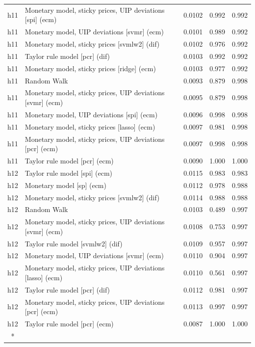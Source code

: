 \begin{ThreePartTable}
\begin{longtable}[t]{cp{5.5cm}ccc}
\addlinespace
h11 & \raggedright Monetary model, sticky prices, UIP deviations [spi] (ecm) & 0.0102 & 0.992 & 0.992\\
h11 & \raggedright Monetary model, UIP deviations [svmr] (ecm) & 0.0101 & 0.989 & 0.992\\
h11 & \raggedright Monetary model, sticky prices [svmlw2] (dif) & 0.0102 & 0.976 & 0.992\\
h11 & \raggedright Taylor rule model [pcr] (dif) & 0.0103 & 0.992 & 0.992\\
h11 & \raggedright Monetary model, sticky prices [ridge] (ecm) & 0.0103 & 0.977 & 0.992\\
h11 & \raggedright Random Walk & 0.0093 & 0.879 & 0.998\\
h11 & \raggedright Monetary model, sticky prices, UIP deviations [svmr] (ecm) & 0.0095 & 0.879 & 0.998\\
h11 & \raggedright Monetary model, UIP deviations [spi] (ecm) & 0.0096 & 0.998 & 0.998\\
h11 & \raggedright Monetary model, sticky prices [lasso] (ecm) & 0.0097 & 0.981 & 0.998\\
h11 & \raggedright Monetary model, sticky prices, UIP deviations [pcr] (ecm) & 0.0097 & 0.998 & 0.998\\
h11 & \raggedright Taylor rule model [pcr] (ecm) & 0.0090 & 1.000 & 1.000\\
\addlinespace
h12 & \raggedright Taylor rule model [spi] (ecm) & 0.0115 & 0.983 & 0.983\\
h12 & \raggedright Monetary model [sp] (ecm) & 0.0112 & 0.978 & 0.988\\
h12 & \raggedright Monetary model, sticky prices [svmlw2] (dif) & 0.0114 & 0.988 & 0.988\\
h12 & \raggedright Random Walk & 0.0103 & 0.489 & 0.997\\
h12 & \raggedright Monetary model, sticky prices, UIP deviations [svmr] (ecm) & 0.0108 & 0.753 & 0.997\\
h12 & \raggedright Taylor rule model [svmlw2] (dif) & 0.0109 & 0.957 & 0.997\\
h12 & \raggedright Monetary model, UIP deviations [svmr] (ecm) & 0.0110 & 0.904 & 0.997\\
h12 & \raggedright Monetary model, sticky prices, UIP deviations [lasso] (ecm) & 0.0110 & 0.561 & 0.997\\
h12 & \raggedright Taylor rule model [pcr] (dif) & 0.0112 & 0.981 & 0.997\\
h12 & \raggedright Monetary model, sticky prices, UIP deviations [pcr] (ecm) & 0.0113 & 0.997 & 0.997\\
h12 & \raggedright Taylor rule model [pcr] (ecm) & 0.0087 & 1.000 & 1.000\\*
\end{longtable}
\end{ThreePartTable}
\endgroup{}
